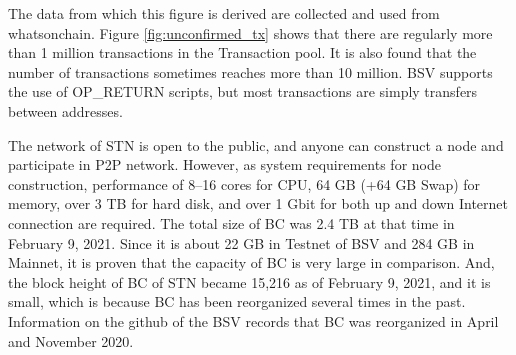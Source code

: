 \documentclass[graybox]{svmult}
\begin{document}
The data from which this figure is derived are collected and used from whatsonchain\cite{woc}.
Figure \ref{fig:unconfirmed_tx} shows that there are regularly more than 1 million transactions in the Transaction pool. 
It is also found that the number of transactions sometimes reaches more than 10 million.
BSV supports the use of OP\_RETURN scripts, but most transactions are simply transfers between addresses.


The network of STN is open to the public, and anyone can construct a node and participate in P2P network.
However, as system requirements for node construction, performance of 8--16 cores for CPU, 64 GB (+64 GB Swap) for memory, over 3 TB for hard disk, and over 1 Gbit for both up and down Internet connection are required.
The total size of BC was 2.4 TB at that time in February 9, 2021.
Since it is about 22 GB in Testnet of BSV and 284 GB in Mainnet, it is proven that the capacity of BC is very large in comparison.
And, the block height of BC of STN became 15,216 as of February 9, 2021, and it is small, which is because BC has been reorganized several times in the past.
Information on the github of the BSV records that BC was reorganized in April and November 2020. 
\end{document}
